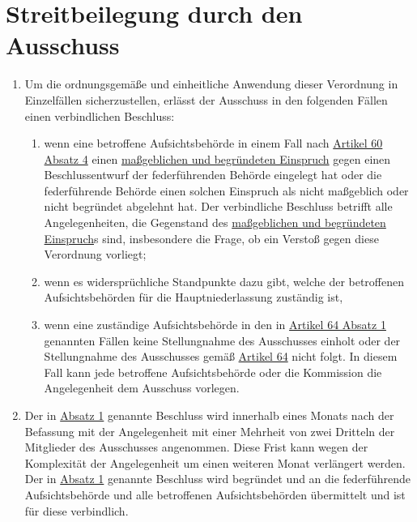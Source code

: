 \chapter{Streitbeilegung durch den Ausschuss}
\label{ch:65}


\begin{enumerate}

  \item Um die ordnungsgemäße und einheitliche Anwendung dieser Verordnung in Einzelfällen sicherzustellen, erlässt der
   Ausschuss in den folgenden Fällen einen verbindlichen Beschluss:
  \label{itm:65-1}

  \begin{enumerate}
  
    \item wenn eine betroffene Aufsichtsbehörde in einem Fall nach \hyperref[itm:60-4]{Artikel 60 Absatz 4} einen
     \hyperref[itm:04-27]{maßgeblichen und begründeten Einspruch} gegen einen Beschlussentwurf der federführenden Behörde eingelegt hat oder
     die federführende Behörde einen solchen Einspruch als nicht maßgeblich oder nicht begründet abgelehnt hat. Der
     verbindliche Beschluss betrifft alle Angelegenheiten, die Gegenstand des \hyperref[itm:04-27]{maßgeblichen und begründeten Einspruch}s
     sind, insbesondere die Frage, ob ein Verstoß gegen diese Verordnung vorliegt;
    \label{itm:65-1a}

    \item wenn es widersprüchliche Standpunkte dazu gibt, welche der betroffenen Aufsichtsbehörden für die
     Hauptniederlassung zuständig ist,
    \label{itm:65-1b}

    \item wenn eine zuständige Aufsichtsbehörde in den in \hyperref[itm:64-1]{Artikel 64 Absatz 1} genannten Fällen
     keine Stellungnahme des Ausschusses einholt oder der Stellungnahme des Ausschusses gemäß \hyperref[ch:64]
     {Artikel 64} nicht folgt. In diesem Fall kann jede betroffene Aufsichtsbehörde oder die Kommission die
     Angelegenheit dem Ausschuss vorlegen.
    \label{itm:65-1c}

  \end{enumerate}

  \item Der in \hyperref[itm:65-1]{Absatz 1} genannte Beschluss wird innerhalb eines Monats nach der Befassung mit der
   Angelegenheit mit einer Mehrheit von zwei Dritteln der Mitglieder des Ausschusses angenommen. Diese Frist kann wegen
   der Komplexität der Angelegenheit um einen weiteren Monat verlängert werden. Der in \hyperref[itm:65-1]{Absatz 1}
   genannte Beschluss wird begründet und an die federführende Aufsichtsbehörde und alle betroffenen Aufsichtsbehörden
   übermittelt und ist für diese verbindlich.
  \label{itm:65-2}


\end{enumerate}
